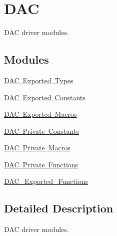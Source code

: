 \hypertarget{group___d_a_c}{}\section{D\+AC}
\label{group___d_a_c}


D\+AC driver modules.  


\subsection*{Modules}
\begin{DoxyCompactItemize}
\item 
\mbox{\hyperlink{group___d_a_c___exported___types}{D\+A\+C Exported Types}}
\item 
\mbox{\hyperlink{group___d_a_c___exported___constants}{D\+A\+C Exported Constants}}
\item 
\mbox{\hyperlink{group___d_a_c___exported___macros}{D\+A\+C Exported Macros}}
\item 
\mbox{\hyperlink{group___d_a_c___private___constants}{D\+A\+C Private Constants}}
\item 
\mbox{\hyperlink{group___d_a_c___private___macros}{D\+A\+C Private Macros}}
\item 
\mbox{\hyperlink{group___d_a_c___private___functions}{D\+A\+C Private Functions}}
\item 
\mbox{\hyperlink{group___d_a_c___exported___functions}{D\+A\+C\+\_\+\+Exported\+\_\+\+Functions}}
\end{DoxyCompactItemize}


\subsection{Detailed Description}
D\+AC driver modules. 

